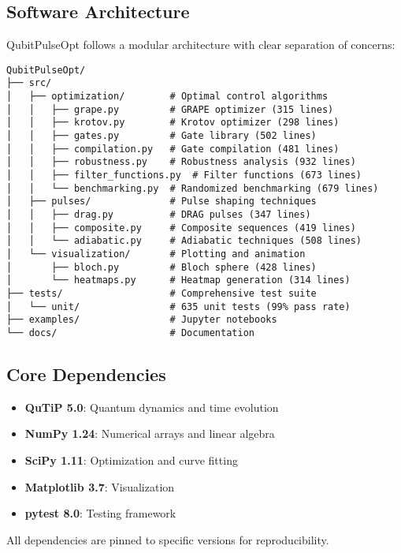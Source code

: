 \documentclass[11pt,a4paper]{article}
\theoremstyle{definition}
\theoremstyle{remark}
\begin{document}
\subsection{Software Architecture}

QubitPulseOpt follows a modular architecture with clear separation of concerns:

\begin{verbatim}
QubitPulseOpt/
├── src/
│   ├── optimization/        # Optimal control algorithms
│   │   ├── grape.py         # GRAPE optimizer (315 lines)
│   │   ├── krotov.py        # Krotov optimizer (298 lines)
│   │   ├── gates.py         # Gate library (502 lines)
│   │   ├── compilation.py   # Gate compilation (481 lines)
│   │   ├── robustness.py    # Robustness analysis (932 lines)
│   │   ├── filter_functions.py  # Filter functions (673 lines)
│   │   └── benchmarking.py  # Randomized benchmarking (679 lines)
│   ├── pulses/              # Pulse shaping techniques
│   │   ├── drag.py          # DRAG pulses (347 lines)
│   │   ├── composite.py     # Composite sequences (419 lines)
│   │   └── adiabatic.py     # Adiabatic techniques (508 lines)
│   └── visualization/       # Plotting and animation
│       ├── bloch.py         # Bloch sphere (428 lines)
│       └── heatmaps.py      # Heatmap generation (314 lines)
├── tests/                   # Comprehensive test suite
│   └── unit/                # 635 unit tests (99% pass rate)
├── examples/                # Jupyter notebooks
└── docs/                    # Documentation
\end{verbatim}

\subsection{Core Dependencies}

\begin{itemize}
    \item \textbf{QuTiP 5.0}: Quantum dynamics and time evolution
    \item \textbf{NumPy 1.24}: Numerical arrays and linear algebra
    \item \textbf{SciPy 1.11}: Optimization and curve fitting
    \item \textbf{Matplotlib 3.7}: Visualization
    \item \textbf{pytest 8.0}: Testing framework
\end{itemize}

All dependencies are pinned to specific versions for reproducibility.
\end{document}

